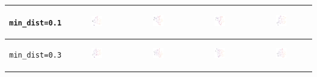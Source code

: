 \begin{tabular}{c|c|c|c|c}
	\begin{sideways} \verb|min_dist=0.1| \end{sideways} & \includegraphics*[width = 0.2\textwidth]{min=0,1,n=6.png} & \includegraphics*[width = 0.2\textwidth]{min=0,1,n=7.png} & \includegraphics*[width = 0.2\textwidth]{min=0,1,n=8.png} & \includegraphics*[width = 0.2\textwidth]{min=0,1,n=9.png}\\
	\hline
	\begin{sideways} \verb|min_dist=0.3| \end{sideways} & \includegraphics*[width = 0.2\textwidth]{min=0,3,n=6.png} & \includegraphics*[width = 0.2\textwidth]{min=0,3,n=7.png} & \includegraphics*[width = 0.2\textwidth]{min=0,3,n=8.png} & \includegraphics*[width = 0.2\textwidth]{min=0,3,n=9.png}\\

\end{tabular}

